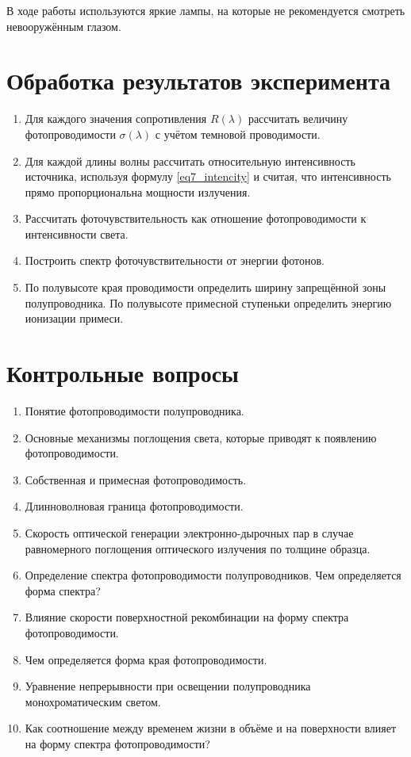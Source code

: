 В ходе работы используются яркие лампы, на которые не рекомендуется смотреть невооружённым глазом.

\section{Обработка результатов эксперимента}

\begin{enumerate}
\item Для каждого значения сопротивления $R(\lambda)$ рассчитать величину фотопроводимости $\sigma(\lambda)$ с учётом темновой проводимости.
\item Для каждой длины волны рассчитать относительную интенсивность источника, используя формулу \ref{eq7_intencity} и считая, что интенсивность прямо пропорциональна мощности излучения.
\item Рассчитать фоточувствительность как отношение фотопроводимости к интенсивности света.
\item Построить спектр фоточувствительности от энергии фотонов.
\item По полувысоте края проводимости определить ширину запрещённой зоны полупроводника. По полувысоте примесной ступеньки определить энергию ионизации примеси.
\end{enumerate}

\section{Контрольные вопросы}

\begin{enumerate}
\item Понятие фотопроводимости полупроводника.
\item Основные механизмы поглощения света, которые приводят к появлению фотопроводимости.
\item Собственная и примесная фотопроводимость.
\item Длинноволновая граница фотопроводимости.
\item Скорость оптической генерации электронно-дырочных пар в случае равномерного поглощения оптического излучения по толщине образца.
\item Определение спектра фотопроводимости полупроводников. Чем определяется форма спектра?
\item Влияние скорости поверхностной рекомбинации на форму спектра фотопроводимости.
\item Чем определяется форма края фотопроводимости.
\item Уравнение непрерывности при освещении полупроводника монохроматическим светом.
\item Как соотношение между временем жизни в объёме и на поверхности влияет на форму спектра фотопроводимости?
\end{enumerate}

